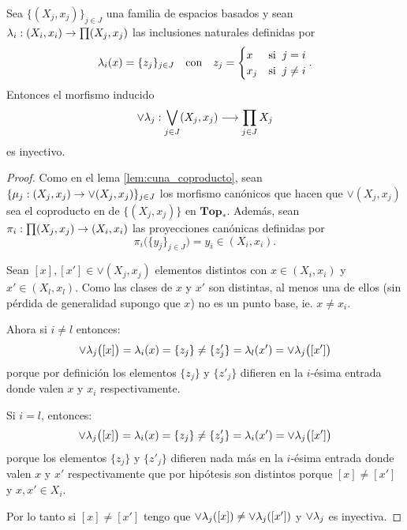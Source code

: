 
\begin{ejercicio}\label{ej:6}
Sea $\{(X_j,x_j)\}_{j\in J}$ una familia de espacios basados y sean $\lambda_i:(X_i,x_i)\rightarrow\prod(X_j,x_j)$
las inclusiones naturales definidas por
\[
	\lambda_i(x)=\{z_j\}_{j\in J} \quad\text{con}\quad z_j=
	\begin{cases}
		x & \text{si}\;\; j=i\\
		x_j & \text{si}\;\; j\neq i
	\end{cases}.
\]
Entonces el morfismo inducido
\[
\vee\lambda_j : \bigvee_{j\in J}(X_j,x_j) \longrightarrow \prod_{j\in J}X_j
\]
es inyectivo.
\end{ejercicio}

\begin{proof}%
Como en el lema \ref{lem:cuna_coproducto}, sean $\{\mu_j:(X_j,x_j)\rightarrow\vee(X_j,x_j)\}_{j\in J}$ los
morfismo can\'onicos que hacen que $\vee(X_j,x_j)$ sea el coproducto en de $\{(X_j,x_j)\}$ en $\mathbf{Top}_*$.
Adem\'as, sean $\pi_i:\prod(X_j,x_j)\rightarrow (X_i,x_i)$ las proyecciones can\'onicas definidas por
\[
	\pi_i\big(\{y_j\}_{j\in J}\big)=y_i\in (X_i,x_i).
\]

Sean $[x],[x']\in\vee(X_j,x_j)$ elementos distintos con $x\in(X_i,x_i)$ y $x'\in(X_l,x_l)$. Como las
clases de $x$ y $x'$ son distintas, al menos una de ellos (sin p\'erdida de generalidad supongo que $x$)
no es un punto base, ie. $x\neq x_i$.

Ahora si $i\neq l$ entonces:
\[
	\vee\lambda_j \big( [x] \big)=\lambda_i(x)=\{z_j\}\neq \{z'_j\}=\lambda_l(x')=\vee\lambda_j\big( [x'] \big)
\]
porque por definici\'on los elementos $\{z_j\}$ y $\{z'_j\}$ difieren en la $i$-\'esima entrada
donde valen $x$ y $x_i$ respectivamente.

Si $i=l$, entonces:
\[
	\vee\lambda_j \big( [x] \big)=\lambda_i(x)=\{z_j\}\neq \{z'_j\}=\lambda_i(x')=\vee\lambda_j\big( [x'] \big)
\]
porque los elementos $\{z_j\}$ y $\{z'_j\}$ difieren nada m\'as en la $i$-\'esima entrada donde valen
$x$ y $x'$ respectivamente que por hip\'otesis son distintos porque $[x]\neq[x']$ y $x,x'\in X_i$.

Por lo tanto si $[x]\neq[x']$ tengo que $\vee\lambda_j([x])\neq\vee\lambda_j([x'])$ y $\vee\lambda_j$ es inyectiva.

\end{proof}%

